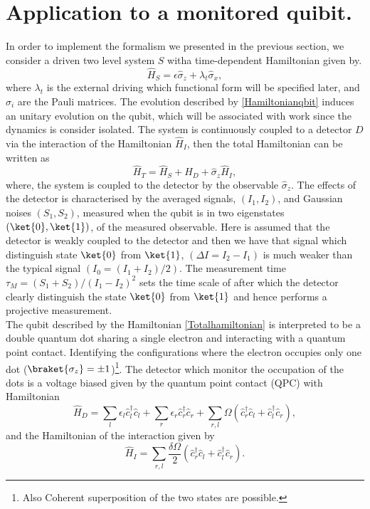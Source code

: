 \section{Application to a monitored quibit.}
In order to implement the formalism we presented in the previous section, we consider a driven two level system $S$ witha time-dependent Hamiltonian given by.
\begin{equation}
\hat{H}_{S}=\epsilon\hat{\sigma}_z+\lambda_t \hat{\sigma}_x,
\label{Hamiltonianqbit}
\end{equation}
where $\lambda_t$ is the external driving which functional form will be specified later, and $\hat{\sigma}_i$ are the Pauli matrices. The evolution described by \eqref{Hamiltonianqbit} induces an unitary evolution on the qubit, which will be associated with work since the dynamics is consider isolated. The system is continuously   coupled to a detector $D$ via the interaction of the Hamiltonian $\hat{H}_{I}$, then the total Hamiltonian can be written as
\begin{equation}
\hat{H}_T=\hat{H}_{S}+\hat{H}_{D}+\hat{\sigma}_z\hat{H}_{I},
\label{Totalhamiltonian}
\end{equation}
where, the system is coupled to the detector by the observable $\hat{\sigma}_z$. The effects of the detector is characterised by the averaged signals, $(I_1,I_2)$, and Gaussian noises $(S_1,S_2)$, measured when the qubit is in two eigenstates $(\ket{0},\ket{1})$, of the measured observable. Here is assumed that the detector is weakly coupled to the detector and then we have that signal which distinguish state $\ket{0}$ from $\ket{1}$, $(\Delta I=I_2-I_1)$ is much weaker than the typical signal $(I_0=(I_1+I_2)/2)$. The measurement time $\tau_M=(S_1+S_2)/(I_1-I_2)^2$ sets the time scale of after which the detector clearly distinguish the state $\ket{0}$ from $\ket{1}$ and hence performs a projective measurement.\cite{2540650509c442d0b14e917fdf7a4ca7}\\
The qubit described by the Hamiltonian \eqref{Totalhamiltonian} is interpreted to be a double quantum dot sharing a single electron and interacting with a quantum point contact. Identifying the configurations where the electron occupies only one dot ($\braket{\sigma_z}=\pm 1$)\footnote{Also Coherent superposition of the two states are possible.}. The detector which monitor the occupation of the dots is a voltage biased given by the quantum point contact (QPC) with Hamiltonian \cite{PhysRevB.56.15215,PhysRevB.63.115403,Alexander}
\begin{equation}
\hat{H}_D=\sum_l \epsilon_l \hat{c}_{l}^{\dagger}\hat{c}_l+\sum_r \epsilon_r \hat{c}_{r}^{\dagger}\hat{c}_{r}+\sum_{r,l} \Omega (\hat{c}_{r}^{\dagger}\hat{c}_{l}+\hat{c}_{l}^{\dagger}\hat{c}_{r}),
\label{detectorhamiltonian}
\end{equation}
and the Hamiltonian of the interaction given by
\begin{equation}
\hat{H}_{I}=\sum_{r,l}\frac{\delta \Omega}{2}(\hat{c}_{r}^{\dagger}\hat{c}_{l}+\hat{c}_{l}^{\dagger}\hat{c}_{r}).
\label{interactionHamiltonian}
\end{equation}

